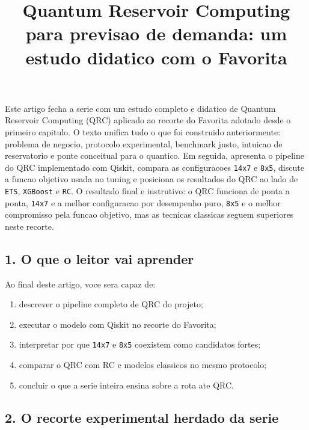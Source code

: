 \documentclass[12pt]{article}
\title{Quantum Reservoir Computing para previsao de demanda: um estudo didatico com o Favorita}
\author{}
\providecommand{\tightlist}{%
          \setlength{\itemsep}{0pt}\setlength{\parskip}{0pt}}
\begin{document}
        \maketitle

        \begin{resumo}
        Este artigo fecha a serie com um estudo completo e didatico de Quantum Reservoir Computing (QRC) aplicado ao recorte do Favorita adotado desde o primeiro capitulo. O texto unifica tudo o que foi construido anteriormente: problema de negocio, protocolo experimental, benchmark justo, intuicao de reservatorio e ponte conceitual para o quantico. Em seguida, apresenta o pipeline do QRC implementado com Qiskit, compara as configuracoes \texttt{14x7} e \texttt{8x5}, discute a funcao objetivo usada no tuning e posiciona os resultados do QRC ao lado de \texttt{ETS}, \texttt{XGBoost} e \texttt{RC}. O resultado final e instrutivo: o QRC funciona de ponta a ponta, \texttt{14x7} e a melhor configuracao por desempenho puro, \texttt{8x5} e o melhor compromisso pela funcao objetivo, mas as tecnicas classicas seguem superiores neste recorte.
        \end{resumo}

        \subsection{1. O que o leitor vai aprender}\label{1-o-que-o-leitor-vai-aprender}

Ao final deste artigo, voce sera capaz de:

\begin{enumerate}
\def\labelenumi{\arabic{enumi}.}
\tightlist
\item
  descrever o pipeline completo de QRC do projeto;
\item
  executar o modelo com Qiskit no recorte do Favorita;
\item
  interpretar por que \texttt{14x7} e \texttt{8x5} coexistem como candidatos fortes;
\item
  comparar o QRC com RC e modelos classicos no mesmo protocolo;
\item
  concluir o que a serie inteira ensina sobre a rota ate QRC.
\end{enumerate}

\subsection{2. O recorte experimental herdado da serie}\label{2-o-recorte-experimental-herdado-da-serie}
\end{document}

